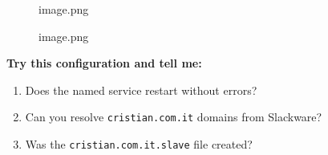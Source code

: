 \begin{figure}
\centering
{}
\caption{image.png}
\end{figure}

\begin{figure}
\centering
{}
\caption{image.png}
\end{figure}

\textbf{Try this configuration and tell me:}

\begin{enumerate}
\def\labelenumi{\arabic{enumi}.}
\tightlist
\item
  Does the named service restart without errors?
\item
  Can you resolve \texttt{cristian.com.it} domains from Slackware?
\item
  Was the \texttt{cristian.com.it.slave} file created?
\end{enumerate}

